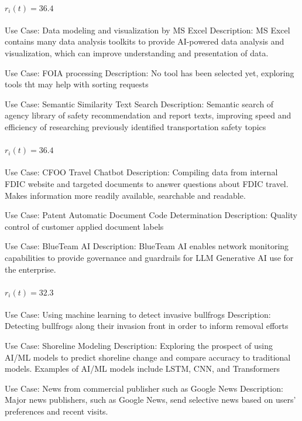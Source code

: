 \paragraph{$r_i(t) = 36.4$}
\begin{description}[style=nextline,leftmargin=1em,font=\normalfont\bfseries]
  \item[Anchor] Use Case: Data modeling and visualization by MS Excel
Description: MS Excel contains many data analysis toolkits to provide AI-powered data analysis and visualization, which can improve understanding and presentation of data. 
  \item[Human-judged closer] Use Case: FOIA processing
Description: No tool has been selected yet, exploring tools tht may help with sorting requests
  \item[Human-judged farther] Use Case: Semantic Similarity Text Search
Description: Semantic search of agency library of safety recommendation and report texts, improving speed and efficiency of researching previously identified transportation safety topics
\end{description}
\paragraph{$r_i(t) = 36.4$}
\begin{description}[style=nextline,leftmargin=1em,font=\normalfont\bfseries]
  \item[Anchor] Use Case: CFOO Travel Chatbot
Description: Compiling data from internal FDIC website and targeted documents to answer questions about FDIC travel. Makes information more readily available, searchable and readable.
  \item[Human-judged closer] Use Case: Patent Automatic Document Code Determination
Description: Quality control of customer applied document labels
  \item[Human-judged farther] Use Case: BlueTeam AI
Description: BlueTeam AI enables network monitoring capabilities to provide governance and guardrails for LLM Generative AI use for the enterprise.
\end{description}
\paragraph{$r_i(t) = 32.3$}
\begin{description}[style=nextline,leftmargin=1em,font=\normalfont\bfseries]
  \item[Anchor] Use Case: Using machine learning to detect invasive bullfrogs
Description: Detecting bullfrogs along their invasion front in order to inform removal efforts
  \item[Human-judged closer] Use Case: Shoreline Modeling
Description: Exploring the prospect of using AI/ML models to predict shoreline change and compare accuracy to traditional models. Examples of AI/ML models include LSTM, CNN, and Transformers
  \item[Human-judged farther] Use Case: News from commercial publisher such as Google News
Description: Major news publishers, such as Google News, send selective news based on users' preferences and recent visits. 
\end{description}
